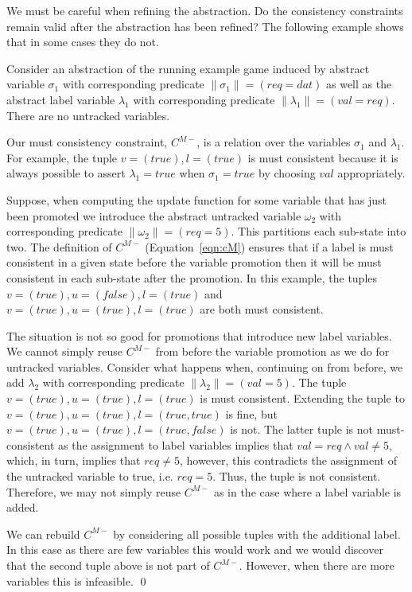 We must be careful when refining the abstraction. Do the consistency constraints remain valid after the abstraction has been refined? The following example shows that in some cases they do not.

\begin{ex}
    Consider an abstraction of the running example game induced by abstract variable $\sigma_1$ with corresponding predicate $\|\sigma_1\| = (req=dat)$ as well as the abstract label variable $\lambda_1$ with corresponding predicate $\|\lambda_1\| = (val=req)$. There are no untracked variables.

    Our must consistency constraint, $C^{M-}$, is a relation over the variables $\sigma_1$ and $\lambda_1$. For example, the tuple $v=(true), l=(true)$ is must consistent because it is always possible to assert $\lambda_1=true$ when $\sigma_1=true$ by choosing $val$ appropriately.

Suppose, when computing the update function for some variable that has just been promoted we introduce the abstract untracked variable $\omega_2$ with corresponding predicate $\|\omega_2\| = (req=5)$. This partitions each sub-state into two. The definition of $C^{M-}$ (Equation~\ref{eqn:cM}) ensures that if a label is must consistent in a given state before the variable promotion then it will be must consistent in each sub-state after the promotion. In this example, the tuples $v=(true), u=(false), l=(true)$ and $v=(true), u=(true), l=(true)$ are both must consistent. 

    The situation is not so good for promotions that introduce new label variables. We cannot simply reuse $C^{M-}$ from before the variable promotion as we do for untracked variables. Consider what happens when, continuing on from before, we add $\lambda_2$ with corresponding predicate $\|\lambda_2\| = (val=5)$. The tuple $v=(true), u=(true), l=(true)$ is must consistent. Extending the tuple to $v=(true), u=(true), l=(true, true)$ is fine, but $v=(true), u=(true), l=(true, false)$ is not. The latter tuple is not must-consistent as the assignment to label variables implies that $val = req \land val\neq5$, which, in turn, implies that $req\neq5$, however, this contradicts the assignment of the untracked variable to true, i.e. $req=5$. Thus, the tuple is not consistent. Therefore, we may not simply reuse $C^{M-}$ as in the case where a label variable is added. 

    We can rebuild $C^{M-}$ by considering all possible tuples with the additional label. In this case as there are few variables this would work and we would discover that the second tuple above is not part of $C^{M-}$. However, when there are more variables this is infeasible. 
    \qed
\end{ex}


